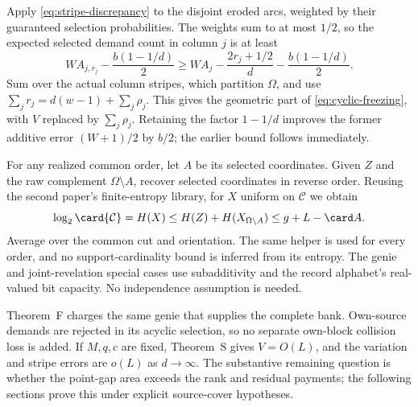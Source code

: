 \begin{outline}
Apply \eqref{eq:stripe-discrepancy} to the disjoint eroded arcs, weighted
by their guaranteed selection probabilities. The weights sum to at most
$1/2$, so the expected selected demand count in column $j$ is at least
\[
 W A_{j,r_j}-\frac{b(1-1/d)}2
 \ge W A_j-\frac{2r_j+1/2}{d}-\frac{b(1-1/d)}2.
\]
Sum over the actual column stripes, which partition $\Omega$, and use
$\sum_j r_j=d(w-1)+\sum_j\rho_j$. This gives the geometric part of
\eqref{eq:cyclic-freezing}, with $V$ replaced by $\sum_j\rho_j$.
Retaining the factor $1-1/d$ improves the former additive error
$(W+1)/2$ by $b/2$; the earlier bound follows immediately.

For any realized common order, let $A$ be its selected coordinates.
Given $Z$ and the raw complement $\Omega\setminus A$, recover selected
coordinates in reverse order. Reusing the second paper's finite-entropy
library, for $X$ uniform on $\mathcal C$ we obtain
\[
 \log_2\card{\mathcal C}=H(X)
       \le H(Z)+H(X_{\Omega\setminus A})
       \le g+L-\card A.
\]
Average over the common cut and orientation. The same helper is used
for every order, and no support-cardinality bound is inferred from its
entropy. The genie and joint-revelation special cases use subadditivity
and the record alphabet's real-valued bit capacity. No independence
assumption is needed.
\end{outline}

Theorem~F charges the same genie that supplies the complete bank.
Own-source demands are rejected in its acyclic selection, so no separate
own-block collision loss is added. If $M,q,c$ are fixed, Theorem~S gives
$V=O(L)$, and the variation and stripe errors are $o(L)$ as
$d\to\infty$. The substantive remaining question is whether the
point-gap area exceeds the rank and residual payments; the following
sections prove this under explicit source-cover hypotheses.

